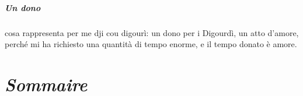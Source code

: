 

\paragraph*{Un dono} cosa rappresenta per me dji cou digourì: un dono per i Digourdì, un atto d'amore, perché mi ha richiesto una quantità di tempo enorme, e il tempo donato è amore. 




\chapter*{\textit{Sommaire}}

